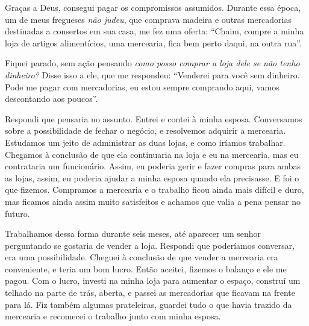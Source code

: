 Graças a Deus, consegui pagar os compromissos assumidos. Durante essa época, um 
de meus fregueses \textit{não judeu}, que comprava madeira e outras
mercadorias destinadas a consertos em sua casa, me fez uma oferta: ``Chaim,
compre a minha loja de artigos alimentícios, uma mercearia, fica bem
perto daqui, na outra rua''.

Fiquei parado, sem ação pensando \textit{como posso comprar a loja dele se
não tenho dinheiro?} Disse isso a ele, que me respondeu: ``Venderei
para você sem dinheiro. Pode me pagar com mercadorias, eu estou
sempre comprando aqui, vamos descontando aos poucos''.

Respondi que pensaria no assunto. Entrei e contei à minha esposa. Conversamos sobre a possibilidade de
fechar o negócio, e resolvemos adquirir a mercearia. Estudamos um
jeito de administrar as duas lojas, e como iríamos trabalhar. Chegamos à
conclusão de que ela continuaria na loja e eu na mercearia, mas
eu contrataria um funcionário. Assim, eu poderia gerir e fazer compras para ambas as lojas, 
assim, eu poderia ajudar a minha esposa quando ela precisasse. E foi o que fizemos. Compramos a mercearia
e o trabalho ficou ainda mais difícil e duro, mas ficamos ainda assim 
muito satisfeitos e achamos que valia a pena pensar no futuro.

Trabalhamos dessa forma durante seis meses, até aparecer um senhor perguntando se 
gostaria de vender a loja. Respondi que poderíamos conversar, era uma possibilidade.
Cheguei à conclusão de que vender a mercearia era conveniente, e teria um bom lucro. 
Então aceitei, fizemos o balanço e ele me pagou. Com o lucro, investi
na minha loja para aumentar o espaço, construí um telhado na parte de trás, aberta, 
e passei as mercadorias que ficavam na frente para lá. Fiz também 
algumas prateleiras, guardei tudo o que havia trazido da mercearia e
recomecei o trabalho junto com minha esposa.



